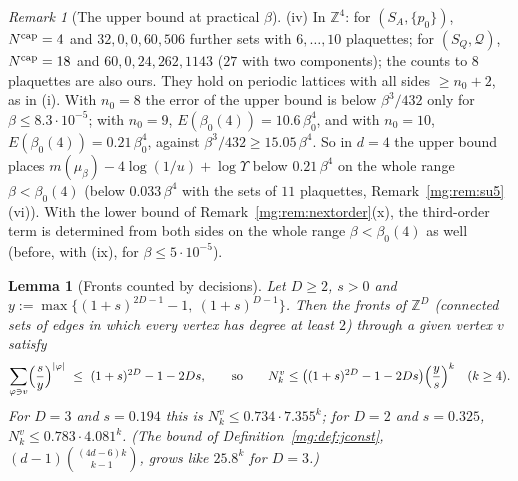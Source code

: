 \documentclass[11pt,a4paper]{article}
\newtheorem{lemma}[theorem]{Lemma}
\theoremstyle{definition}
\theoremstyle{remark}
\newtheorem{remark}[theorem]{Remark}
\newcommand{\Z}{\mathbb{Z}}
\begin{document}
\begin{remark}[The upper bound at practical $\beta$]
(iv) In $\Z^4$: for $(S_A,\{p_0\})$, $N^{\rm cap}=4$ and $32,0,0,60,506$ further sets with $6,\dots,10$ plaquettes; for $(S_Q,\mathcal Q)$, $N^{\rm cap}=18$ and $60,0,24,262,1143$ ($27$
with two components); the counts to $8$ plaquettes are also ours. They hold on periodic lattices with all sides $\ge n_0+2$, as in (i). With $n_0=8$ the error of the upper bound is
below $\beta^3/432$ only for $\beta\le8.3\cdot10^{-5}$; with $n_0=9$, $E(\beta_0(4))=10.6\,\beta_0^4$, and with $n_0=10$, $E(\beta_0(4))=0.21\,\beta_0^4$, against $\beta^3/432\ge15.05\,\beta^4$. So in $d=4$ the
upper bound places $m(\mu_\beta)-4\log(1/u)+\log\Upsilon$ below $0.21\,\beta^4$ on the whole range $\beta<\beta_0(4)$ (below $0.033\,\beta^4$ with the sets of $11$ plaquettes,
Remark~\ref{mg:rem:su5}(vi)). With the lower bound of Remark~\ref{mg:rem:nextorder}(x), the third-order term is
determined from both sides on the whole range $\beta<\beta_0(4)$ as well (before, with (ix), for $\beta\le5\cdot10^{-5}$).
\end{remark}


\begin{lemma}[Fronts counted by decisions]\label{mg:lem:frontsdecision}
Let $D\ge2$, $s>0$ and $y:=\max\{(1+s)^{2D-1}-1,\ (1+s)^{D-1}\}$. Then the fronts of $\Z^D$ (connected sets of edges in which every vertex has degree at least $2$)
through a given vertex $v$ satisfy
\[
\sum_{\varphi\ni v}\Bigl(\frac sy\Bigr)^{|\varphi|}\ \le\ (1+s)^{2D}-1-2Ds,\qquad\text{so}\qquad N^v_k\le\bigl((1+s)^{2D}-1-2Ds\bigr)\Bigl(\frac ys\Bigr)^k\quad(k\ge4).
\]
For $D=3$ and $s=0.194$ this is $N^v_k\le0.734\cdot7.355^k$; for $D=2$ and $s=0.325$, $N^v_k\le0.783\cdot4.081^k$. (The bound of Definition~\ref{mg:def:jconst},
$(d-1)\binom{(4d-6)k}{k-1}$, grows like $25.8^k$ for $D=3$.)
\end{lemma}
\end{document}
